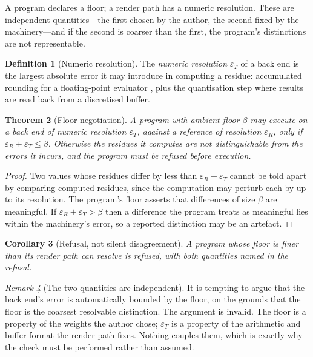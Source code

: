 \documentclass[11pt,twocolumn,a4paper]{article}
\newtheorem{theorem}{Theorem}[section]
\newtheorem{corollary}[theorem]{Corollary}
\theoremstyle{definition}
\newtheorem{definition}[theorem]{Definition}
\theoremstyle{remark}
\newtheorem{remark}[theorem]{Remark}
\newcommand{\flo}{\beta}
\begin{document}
A program declares a floor; a render path has a numeric resolution. These are
independent quantities---the first chosen by the author, the second fixed by the
machinery---and if the second is coarser than the first, the program's
distinctions are not representable.

\begin{definition}[Numeric resolution]
\label{def:numres}
The \emph{numeric resolution} $\varepsilon_T$ of a back end is the largest
absolute error it may introduce in computing a residue: accumulated rounding for
a floating-point evaluator \citep{goldberg1991what,higham2002accuracy}, plus the
quantisation step where results are read back from a discretised buffer.
\end{definition}

\begin{theorem}[Floor negotiation]
\label{thm:negotiate}
A program with ambient floor $\flo$ may execute on a back end of numeric
resolution $\varepsilon_T$, against a reference of resolution $\varepsilon_R$,
only if $\varepsilon_R+\varepsilon_T\le\flo$. Otherwise the residues it computes
are not distinguishable from the errors it incurs, and the program must be
refused before execution.
\end{theorem}

\begin{proof}
Two values whose residues differ by less than $\varepsilon_R+\varepsilon_T$
cannot be told apart by comparing computed residues, since the computation may
perturb each by up to its resolution. The program's floor asserts that
differences of size $\flo$ are meaningful. If $\varepsilon_R+\varepsilon_T>\flo$
then a difference the program treats as meaningful lies within the machinery's
error, so a reported distinction may be an artefact.
\end{proof}

\begin{corollary}[Refusal, not silent disagreement]
\label{cor:refuse}
A program whose floor is finer than its render path can resolve is refused, with
both quantities named in the refusal.
\end{corollary}

\begin{remark}[The two quantities are independent]
\label{rem:indep}
It is tempting to argue that the back end's error is automatically bounded by the
floor, on the grounds that the floor is the coarsest resolvable distinction. The
argument is invalid. The floor is a property of the weights the author chose;
$\varepsilon_T$ is a property of the arithmetic and buffer format the render path
fixes. Nothing couples them, which is exactly why the check must be performed
rather than assumed.
\end{remark}
\end{document}
